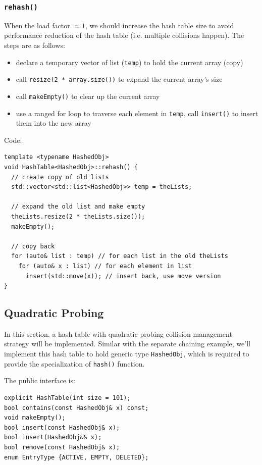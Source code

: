 \documentclass[11pt]{book}
\begin{document}
\subsubsection{\texttt{rehash()}}
\label{sec:org173b479}
When the load factor \(\approx 1\), we should increase the hash table size to avoid performance reduction of the hash table (i.e. multiple collisions happen). The steps are as follows:
\begin{itemize}
\item declare a temporary vector of list (\texttt{temp}) to hold the current array (copy)
\item call \texttt{resize(2 * array.size())} to expand the current array's size
\item call \texttt{makeEmpty()} to clear up the current array
\item use a ranged for loop to traverse each element in \texttt{temp}, call \texttt{insert()} to insert them into the new array
\end{itemize}

Code:
\begin{verbatim}
template <typename HashedObj>
void HashTable<HashedObj>::rehash() {
  // create copy of old lists
  std::vector<std::list<HashedObj>> temp = theLists;

  // expand the old list and make empty
  theLists.resize(2 * theLists.size());
  makeEmpty();

  // copy back
  for (auto& list : temp) // for each list in the old theLists 
    for (auto& x : list) // for each element in list 
      insert(std::move(x)); // insert back, use move version
}
\end{verbatim}

\subsection{Quadratic Probing}
\label{sec:orgaa1815f}
In this section, a hash table with quadratic probing collision management strategy will be implemented. Similar with the separate chaining example, we'll implement this hash table to hold generic type \texttt{HashedObj}, which is required to provide the specialization of \texttt{hash()} function.

The public interface is:
\begin{verbatim}
explicit HashTable(int size = 101);
bool contains(const HashedObj& x) const;
void makeEmpty();
bool insert(const HashedObj& x);
bool insert(HashedObj&& x);
bool remove(const HashedObj& x); 
enum EntryType {ACTIVE, EMPTY, DELETED};
\end{verbatim}
\end{document}

